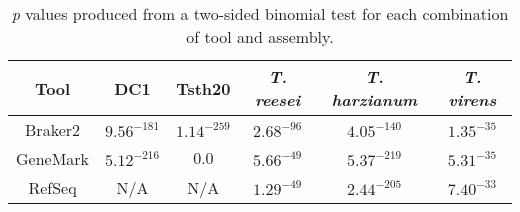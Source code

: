 \begin{table}
  \begin{center}
    \begin{tabular}{|c|c|c|c|c|c|}
      \hline
      Tool & DC1 & Tsth20 & \textit{T. reesei} & \textit{T. harzianum} & \textit{T. virens} \\ \hline
      Braker2 & $9.56^{-181}$ & $1.14^{-259}$ & $2.68^{-96}$ & $4.05^{-140}$ & $1.35^{-35}$ \\ \hline
      GeneMark & $5.12^{-216}$ & $0.0$ & $5.66^{-49}$ & $5.37^{-219}$ & $5.31^{-35}$ \\ \hline
      RefSeq & N/A & N/A & $1.29^{-49}$ & $2.44^{-205}$ & $7.40^{-33}$ \\ \hline
    \end{tabular}
  \end{center}
  \caption{\textit{p} values produced from a two-sided binomial test
    for each combination of tool and assembly.}
  \label{table:gc-binomial}
\end{table}
